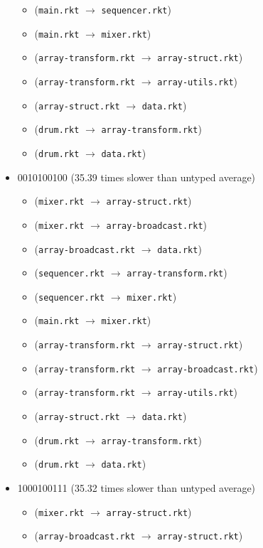 \documentclass{article}
\newcommand{\mono}[1]{\texttt{#1}}
\begin{document}
\begin{itemize}
\begin{itemize}
  \item (\mono{main.rkt} $\rightarrow$ \mono{sequencer.rkt})
  \item (\mono{main.rkt} $\rightarrow$ \mono{mixer.rkt})
  \item (\mono{array-transform.rkt} $\rightarrow$ \mono{array-struct.rkt})
  \item (\mono{array-transform.rkt} $\rightarrow$ \mono{array-utils.rkt})
  \item (\mono{array-struct.rkt} $\rightarrow$ \mono{data.rkt})
  \item (\mono{drum.rkt} $\rightarrow$ \mono{array-transform.rkt})
  \item (\mono{drum.rkt} $\rightarrow$ \mono{data.rkt})
  \end{itemize}
\item 0010100100 (35.39 times slower than untyped average)
  \begin{itemize}
  \item (\mono{mixer.rkt} $\rightarrow$ \mono{array-struct.rkt})
  \item (\mono{mixer.rkt} $\rightarrow$ \mono{array-broadcast.rkt})
  \item (\mono{array-broadcast.rkt} $\rightarrow$ \mono{data.rkt})
  \item (\mono{sequencer.rkt} $\rightarrow$ \mono{array-transform.rkt})
  \item (\mono{sequencer.rkt} $\rightarrow$ \mono{mixer.rkt})
  \item (\mono{main.rkt} $\rightarrow$ \mono{mixer.rkt})
  \item (\mono{array-transform.rkt} $\rightarrow$ \mono{array-struct.rkt})
  \item (\mono{array-transform.rkt} $\rightarrow$ \mono{array-broadcast.rkt})
  \item (\mono{array-transform.rkt} $\rightarrow$ \mono{array-utils.rkt})
  \item (\mono{array-struct.rkt} $\rightarrow$ \mono{data.rkt})
  \item (\mono{drum.rkt} $\rightarrow$ \mono{array-transform.rkt})
  \item (\mono{drum.rkt} $\rightarrow$ \mono{data.rkt})
  \end{itemize}
\item 1000100111 (35.32 times slower than untyped average)
  \begin{itemize}
  \item (\mono{mixer.rkt} $\rightarrow$ \mono{array-struct.rkt})
  \item (\mono{array-broadcast.rkt} $\rightarrow$ \mono{array-struct.rkt})

\end{itemize}
\end{itemize}
\end{document}

